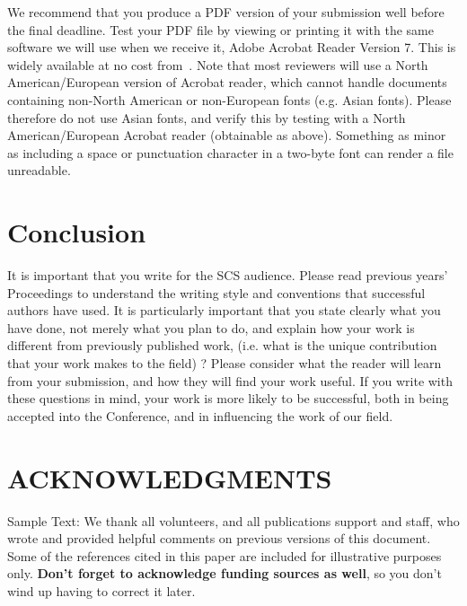 \documentclass{scsPaperFormattingTemplate-LaTex-Revised20160302}
\begin{document}
We recommend that you produce a PDF version of your submission well
before the final deadline.  Test your PDF file by viewing or printing it with the same software we
will use when we receive it, Adobe Acrobat Reader Version 7. This is
widely available at no cost from~\cite{acrobat}.  Note that most
reviewers will use a North American/European version of Acrobat
reader, which cannot handle documents containing non-North American or
non-European fonts (e.g. Asian fonts).  Please therefore do not use
Asian fonts, and verify this by testing with a North American/European
Acrobat reader (obtainable as above). Something as minor as including
a space or punctuation character in a two-byte font can render a file
unreadable.

\balance


\section{Conclusion}

It is important that you write for the SCS audience. Please read previous years’ Proceedings to understand the writing style and conventions that successful authors have used. It is particularly important that you state clearly what you have done, not merely what you plan to do, and explain how your work is different from previously published work, (i.e. what is the unique contribution that your work makes to the field) ? Please consider what the reader will learn from your submission, and how they will find your work useful. If you write with these questions in mind, your work is more likely to be successful, both in being accepted into the Conference, and in influencing the work of our field.


\section*{ACKNOWLEDGMENTS}

Sample Text: We thank all volunteers, and all publications support
and staff, who wrote and provided helpful comments on previous
versions of this document.  Some of the references cited in this paper
are included for illustrative purposes only.  \textbf{Don't forget
to acknowledge funding sources as well}, so you don't wind up
having to correct it later.

%
%
%
%
\end{document}
